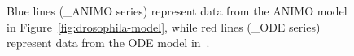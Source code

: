 \documentclass{bmcart}
\renewcommand*\thesubfigure{\Alph{subfigure}}
\begin{document}
\def\drosophilaGraphScale{0.0685}
\renewcommand*\thesubfigure{}
\begin{figure}[!htb]
\begin{minipage}{\textwidth}
  \centering
\caption{ Blue lines ({\sf \_{}ANIMO} series)
represent data from the ANIMO model in Figure~\ref{fig:drosophila-model},
while red lines ({\sf \_{}ODE} series) represent data from the ODE model in~\cite{drosophila-ode-model}.\label{suppl-fig:grafici-drosophila}}
\end{minipage}
\end{figure}
\end{document}
